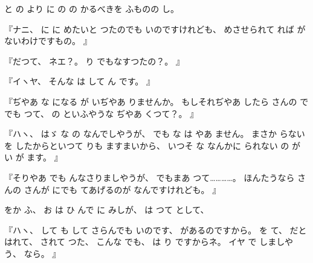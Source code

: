 と
の
より
に
の
の
かるべきを
ふものの
し。

『ナニ、
%
に
に
めたいと
つたのでも
いのですけれども、
%
めさせられて
れば
がないわけですもの。
』

『だつて、
%
ネエ？。
%
り
でもなすつたの？。
』

『イヽヤ、
%
そんな
は
して
ん
です。
』

『ぢやあ
な
になる
が
いぢやあ
りませんか。
%
もしそれぢやあ
したら
さんの
で
でも
つて、
%
の
といふやうな
ぢやあ
くつて？。
』

『ハヽ、
%
はゞ
な
の
なんでしやうが、
%
でも
な
は
やあ
ません。
%
まさか
らない
を
したからといつて
りも
ますまいから、
%
いつそ
な
なんかに
られない
の
が
い
が
ます。
』

『そりやあ
でも
んなさりましやうが、
%
でもまあ
つて…………。
%
ほんたうなら
さんの
さんが
にでも
てあげるのが
なんですけれども。
』

をか
ふ、
%
お
は
ひ
んで
に
みしが、
%
は
つて
として、

『ハヽ、
%
して
も
して
さらんでも
いのです、
%
があるのですから。
%
を
て、
%
だと
はれて、
%
されて
つた、
%
こんな
でも、
%
は
り
ですからネ。
%
イヤ
で
しましやう、
%
なら。
』

